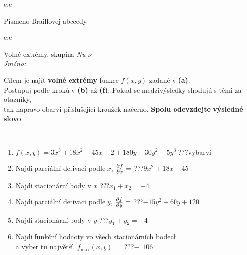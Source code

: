 \documentclass[10pt]{report}
\begin{document}
\begin{tabular}{c:c}
\begin{minipage}[c][104.5mm][t]{0.5\linewidth}
\begin{center}
\begin{minipage}{0.20\linewidth}
\begin{center}
{\small Písmeno Braillovej abecedy}
\end{center}
\end{minipage}
\end{center}
\end{minipage}
%
\end{tabular}
\newpage
\thispagestyle{empty}
\begin{tabular}{c:c}
\begin{minipage}[c][104.5mm][t]{0.5\linewidth}
\begin{center}
\vspace{7mm}
{\huge Volné extrémy, skupina \textit{Nu $\nu$} -}\\[5mm]
\textit{Jméno:}\phantom{xxxxxxxxxxxxxxxxxxxxxxxxxxxxxxxxxxxxxxxxxxxxxxxxxxxxxxxxxxxxxxxxx}\\[5mm]
\begin{minipage}{0.95\linewidth}
\begin{center}
Cílem je najít \textbf{volné extrémy} funkce $f(x,y)$ zadané v \textbf{(a)}.\\Postupuj podle krokú v \textbf{(b)} až \textbf{(f)}. Pokud se medzivýsledky shodujú s těmi za otazníky,\\tak napravo obarvi příslušející kroužek načerno. \textbf{Spolu odevzdejte výsledné slovo}.
\end{center}
\end{minipage}
\\[1mm]
\begin{minipage}{0.79\linewidth}
\begin{center}
\begin{varwidth}{\linewidth}
\begin{enumerate}
\normalsize
\item $f(x,y)=3x^3+18x^2-45x-2+180y-30y^2-5y^3$\quad \dotfill\; ???\;\dotfill \quad vybarvi
\item Najdi parciální derivaci podle $x$, $\pdv{f}{x}=$\quad \dotfill\; ???\;\dotfill \quad $9x^2+18x-45$
\item Najdi stacionární body v $x$\quad \dotfill\; ???\;\dotfill \quad $x_1+x_2=-4$
\item Najdi parciální derivaci podle $y$, $\pdv{f}{y}=$\quad \dotfill\; ???\;\dotfill \quad $-15y^2-60y+120$
\item Najdi stacionární body v $y$\quad \dotfill\; ???\;\dotfill \quad $y_1+y_2=-4$
\item Najdi funkční hodnoty vo všech stacionárních bodech \\ \phantom{xxxxxx} a vyber tu najvětší. $f_{\text{max}}(x,y)=$\quad \dotfill\; ???\;\dotfill \quad $-1106$

\end{enumerate}
\end{varwidth}
\end{center}
\end{minipage}
\end{center}
\end{minipage}
\end{tabular}
\end{document}

